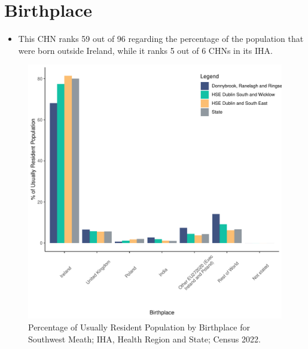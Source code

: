 \documentclass{article}
\begin{document}
\section{Birthplace}\label{sect:Birth}
\begin{itemize}
\item This CHN ranks  59 out of 96 regarding the percentage of the population that were born outside Ireland, while it ranks  5 out of 6 CHNs in its IHA.
\end{itemize}
\begin{figure}[H]
	\centering
	\includegraphics[width = 130mm]{../figures/BirthED.pdf}
	\caption{Percentage of Usually Resident Population by Birthplace for Southwest Meath; IHA, Health Region and State; Census 2022.}
	\label{fig:vbnv}
	\end{figure}
	
\end{document}
